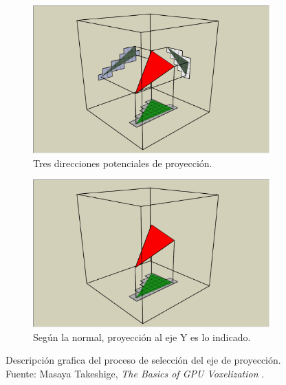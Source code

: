 \begin{figure}[H]
	\centering
	\begin{subfigure}[t]{.49\linewidth}
		\centering
		\captionsetup{justification=centering}
		\includegraphics[width=\linewidth]{media/Voxelization_blog_fig_5.png}
		\caption*{Tres direcciones potenciales de proyección.}
	\end{subfigure}%
	\hspace{0.01\textwidth}
	\begin{subfigure}[t]{.49\linewidth}
		\centering
		\captionsetup{justification=centering}
		\includegraphics[width=\linewidth]{media/Voxelization_blog_fig_6.png}
		\caption*{Según la normal, proyección al eje Y es lo indicado.}
	\end{subfigure}%
	\caption{Descripción grafica del proceso de selección del eje de proyección. Fuente: Masaya Takeshige, \emph{The Basics of GPU Voxelization} \cite{gpuvoxelization}.}
	\label{fig:axis_selection}
\end{figure}

